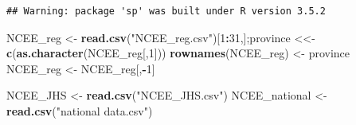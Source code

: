 \documentclass[]{article}
\newenvironment{Shaded}{\begin{snugshade}}{\end{snugshade}}
\newcommand{\KeywordTok}[1]{\textcolor[rgb]{0.13,0.29,0.53}{\textbf{#1}}}
\newcommand{\DecValTok}[1]{\textcolor[rgb]{0.00,0.00,0.81}{#1}}
\newcommand{\StringTok}[1]{\textcolor[rgb]{0.31,0.60,0.02}{#1}}
\newcommand{\OperatorTok}[1]{\textcolor[rgb]{0.81,0.36,0.00}{\textbf{#1}}}
\newcommand{\NormalTok}[1]{#1}
\begin{document}
\begin{verbatim}
## Warning: package 'sp' was built under R version 3.5.2
\end{verbatim}

\begin{Shaded}
\begin{Highlighting}[]
\NormalTok{NCEE_reg <-}\StringTok{ }\KeywordTok{read.csv}\NormalTok{(}\StringTok{"NCEE_reg.csv"}\NormalTok{)[}\DecValTok{1}\OperatorTok{:}\DecValTok{31}\NormalTok{,];province <<-}\StringTok{ }\KeywordTok{c}\NormalTok{(}\KeywordTok{as.character}\NormalTok{(NCEE_reg[,}\DecValTok{1}\NormalTok{]))}
\KeywordTok{rownames}\NormalTok{(NCEE_reg) <-}\StringTok{ }\NormalTok{province}
\NormalTok{NCEE_reg <-}\StringTok{ }\NormalTok{NCEE_reg[,}\OperatorTok{-}\DecValTok{1}\NormalTok{]}

\NormalTok{NCEE_JHS <-}\StringTok{ }\KeywordTok{read.csv}\NormalTok{(}\StringTok{"NCEE_JHS.csv"}\NormalTok{)}
\NormalTok{NCEE_national <-}\StringTok{ }\KeywordTok{read.csv}\NormalTok{(}\StringTok{"national data.csv"}\NormalTok{)}
\end{Highlighting}
\end{Shaded}
\end{document}
